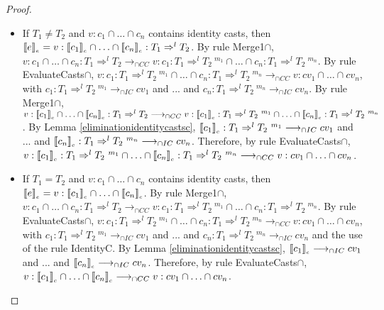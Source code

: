 \documentclass[a4paper]{article}
\begin{document}
\begin{proof}
\begin{itemize}
\begin{itemize}
        \item If $T_1 \neq T_2$ and $v : c_1 \cap \ldots \cap c_n$ contains identity casts, then $\llbracket e \rrbracket_{_e} = v : \llbracket c_1 \rrbracket_{_c} \cap \ldots \cap \llbracket c_n \rrbracket_{_c} : T_1 \Rightarrow^l T_2$.
        By rule Merge1$\cap$, $v : c_1 \cap \ldots \cap c_n : T_1 \Rightarrow^l T_2 \longrightarrow_{\cap CC} v : c_1 : T_1 \Rightarrow^l T_2\ ^{m_1} \cap \ldots \cap c_n : T_1 \Rightarrow^l T_2\ ^{m_n}$.
        By rule EvaluateCasts$\cap$, $v : c_1 : T_1 \Rightarrow^l T_2\ ^{m_1} \cap \ldots \cap c_n : T_1 \Rightarrow^l T_2\ ^{m_n} \longrightarrow_{\cap CC} v : cv_1 \cap \ldots \cap cv_n$, with $c_1 : T_1 \Rightarrow^l T_2\ ^{m_1} \longrightarrow_{\cap IC} cv_1$ and ... and $c_n : T_1 \Rightarrow^l T_2\ ^{m_n} \longrightarrow_{\cap IC} cv_n$.
        By rule Merge1$\cap$, $v : \llbracket c_1 \rrbracket_{_c} \cap \ldots \cap \llbracket c_n \rrbracket_{_c} : T_1 \Rightarrow^l T_2 \longrightarrow_{\cap CC} v : \llbracket c_1 \rrbracket_{_c} : T_1 \Rightarrow^l T_2\ ^{m_1} \cap \ldots \cap \llbracket c_n \rrbracket_{_c} : T_1 \Rightarrow^l T_2\ ^{m_n}$.
        By Lemma \ref{eliminationidentitycastsc}, $\llbracket c_1 \rrbracket_{_c} : T_1 \Rightarrow^l T_2\ ^{m_1} \longrightarrow_{\cap IC} cv_1$ and ... and $\llbracket c_n \rrbracket_{_c} : T_1 \Rightarrow^l T_2\ ^{m_n} \longrightarrow_{\cap IC} cv_n$.
        Therefore, by rule EvaluateCasts$\cap$, $v : \erasec{c_1} : T_1 \Rightarrow^l T_2\ ^{m_1} \cap \ldots \cap \erasec{c_n} : T_1 \Rightarrow^l T_2\ ^{m_n} \longrightarrow_{\cap CC} v : cv_1 \cap \ldots \cap cv_n$.
        \item If $T_1 = T_2$ and $v : c_1 \cap \ldots \cap c_n$ contains identity casts, then $\llbracket e \rrbracket_{_e} = v : \llbracket c_1 \rrbracket_{_c} \cap \ldots \cap \llbracket c_n \rrbracket_{_c}$.
        By rule Merge1$\cap$, $v : c_1 \cap \ldots \cap c_n : T_1 \Rightarrow^l T_2 \longrightarrow_{\cap CC} v : c_1 : T_1 \Rightarrow^l T_2\ ^{m_1} \cap \ldots \cap c_n : T_1 \Rightarrow^l T_2\ ^{m_n}$.
        By rule EvaluateCasts$\cap$, $v : c_1 : T_1 \Rightarrow^l T_2\ ^{m_1} \cap \ldots \cap c_n : T_1 \Rightarrow^l T_2\ ^{m_n} \longrightarrow_{\cap CC} v : cv_1 \cap \ldots \cap cv_n$, with $c_1 : T_1 \Rightarrow^l T_2\ ^{m_1} \longrightarrow_{\cap IC} cv_1$ and ... and $c_n : T_1 \Rightarrow^l T_2\ ^{m_n} \longrightarrow_{\cap IC} cv_n$ and the use of the rule IdentityC.
        By Lemma \ref{eliminationidentitycastsc}, $\llbracket c_1 \rrbracket_{_c} \longrightarrow_{\cap IC} cv_1$ and ... and $\llbracket c_n \rrbracket_{_c} \longrightarrow_{\cap IC} cv_n$.
        Therefore, by rule EvaluateCasts$\cap$, $v : \llbracket c_1 \rrbracket_{_c} \cap \ldots \cap \llbracket c_n \rrbracket_{_c} \longrightarrow_{\cap CC} v : cv_1 \cap \ldots \cap cv_n$.
    \end{itemize}

\end{itemize}
\end{proof}
\end{document}
